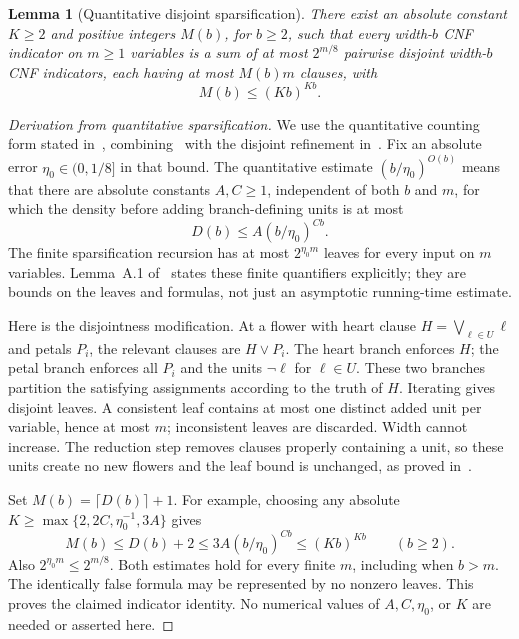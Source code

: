 \documentclass[11pt,letterpaper]{article}
\newtheorem{lemma}[theorem]{Lemma}
\theoremstyle{definition}
\numberwithin{equation}{section}
\begin{document}
\begin{lemma}[Quantitative disjoint sparsification]\label{lem:sparsification}
There exist an absolute constant $K\ge2$ and positive integers $M(b)$,
for $b\ge2$, such that every width-$b$ CNF indicator on $m\ge1$ variables
is a sum of at most $2^{m/8}$ pairwise disjoint width-$b$ CNF indicators,
each having at most $M(b)m$ clauses, with
\begin{equation}\label{eq:sparse}
 M(b)\le(Kb)^{Kb}.
\end{equation}
\end{lemma}
\begin{proof}[Derivation from quantitative sparsification]
We use the quantitative counting form stated in~\cite[Section~4,
p.~6:9]{Williams}, combining~\cite[Section~6]{CIP} with the disjoint
refinement in~\cite[Appendix~A, Lemma~A.1 and its following proof]{DHMTW}.
Fix an absolute error $\eta_0\in(0,1/8]$ in that bound. The quantitative
estimate $(b/\eta_0)^{O(b)}$ means that there are absolute constants
$A,C\ge1$, independent of both $b$ and $m$, for which the density before
adding branch-defining units is at most
\[
 D(b)\le A(b/\eta_0)^{Cb}.
\]
The finite sparsification recursion has at most $2^{\eta_0m}$ leaves
for every input on $m$ variables. Lemma~A.1 of~\cite{DHMTW} states these
finite quantifiers explicitly; they are bounds on the leaves and formulas,
not just an asymptotic running-time estimate.

Here is the disjointness modification. At a flower with heart clause
$H=\bigvee_{\ell\in U}\ell$ and petals $P_i$, the relevant clauses are
$H\vee P_i$. The heart branch enforces $H$; the petal branch enforces
all $P_i$ and the units $\neg\ell$ for $\ell\in U$. These two branches
partition the satisfying assignments according to the truth of $H$.
Iterating gives disjoint leaves. A consistent leaf contains at most one
distinct added unit per variable, hence at most $m$; inconsistent leaves
are discarded. Width cannot increase. The reduction step removes clauses
properly containing a unit, so these units create no new flowers and the
leaf bound is unchanged, as proved in~\cite[Appendix~A]{DHMTW}.

Set $M(b)=\lceil D(b)\rceil+1$. For example, choosing any absolute
$K\ge\max\{2,2C,\eta_0^{-1},3A\}$ gives
\[
 M(b)\le D(b)+2\le3A(b/\eta_0)^{Cb}\le(Kb)^{Kb}
 \qquad(b\ge2).
\]
Also $2^{\eta_0m}\le2^{m/8}$. Both estimates hold for every finite $m$,
including when $b>m$. The identically false formula may be represented
by no nonzero leaves. This proves the claimed indicator identity.
No numerical values of $A,C,\eta_0$, or $K$ are needed or asserted here.
\end{proof}
\end{document}

